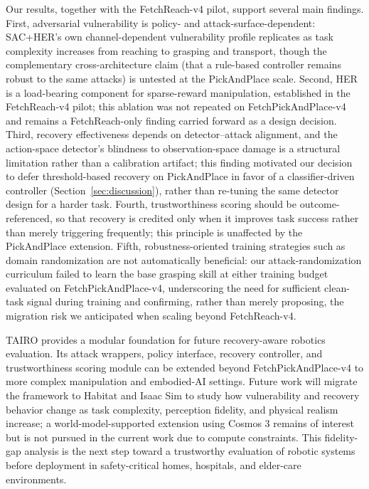 \documentclass[conference]{IEEEtran}
\begin{document}
Our results, together with the FetchReach-v4 pilot, support several main findings.
First, adversarial vulnerability is policy- and attack-surface-dependent: SAC+HER's
own channel-dependent vulnerability profile replicates as task complexity increases
from reaching to grasping and transport, though the complementary cross-architecture
claim (that a rule-based controller remains robust to the same attacks) is untested at
the PickAndPlace scale. Second, HER is a load-bearing component for sparse-reward
manipulation, established in the FetchReach-v4 pilot; this ablation was not repeated on
FetchPickAndPlace-v4 and remains a FetchReach-only finding carried forward as a design
decision. Third, recovery effectiveness depends on detector--attack alignment, and the
action-space detector's blindness to observation-space damage is a structural
limitation rather than a calibration artifact; this finding motivated our decision to
defer threshold-based recovery on PickAndPlace in favor of a classifier-driven
controller (Section~\ref{sec:discussion}), rather than re-tuning the same detector
design for a harder task. Fourth, trustworthiness scoring should be outcome-referenced,
so that recovery is credited only when it improves task success rather than merely
triggering frequently; this principle is unaffected by the PickAndPlace extension.
Fifth, robustness-oriented training strategies such as domain randomization are not
automatically beneficial: our attack-randomization curriculum failed to learn the base
grasping skill at either training budget evaluated on FetchPickAndPlace-v4,
underscoring the need for sufficient clean-task signal during training and confirming,
rather than merely proposing, the migration risk we anticipated when scaling beyond
FetchReach-v4.

TAIRO provides a modular foundation for future recovery-aware robotics evaluation. Its
attack wrappers, policy interface, recovery controller, and trustworthiness scoring
module can be extended beyond FetchPickAndPlace-v4 to more complex manipulation and
embodied-AI settings. Future work will migrate the framework to Habitat and Isaac Sim
to study how vulnerability and recovery behavior change as task complexity, perception
fidelity, and physical realism increase; a world-model-supported extension using Cosmos
3 remains of interest but is not pursued in the current work due to compute
constraints. This fidelity-gap analysis is the next step toward a trustworthy
evaluation of robotic systems before deployment in safety-critical homes, hospitals,
and elder-care environments.
\end{document}
